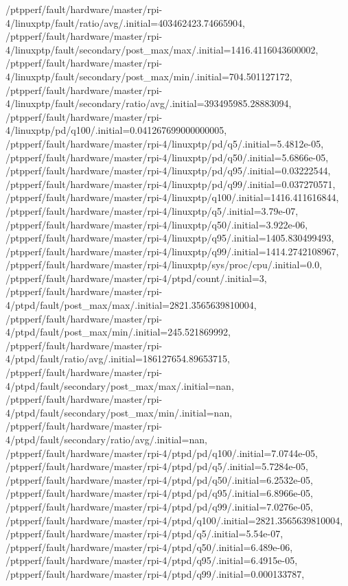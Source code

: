 {    /ptpperf/fault/hardware/master/rpi-4/linuxptp/fault/ratio/avg/.initial=403462423.74665904,
    /ptpperf/fault/hardware/master/rpi-4/linuxptp/fault/secondary/post_max/max/.initial=1416.4116043600002,
    /ptpperf/fault/hardware/master/rpi-4/linuxptp/fault/secondary/post_max/min/.initial=704.501127172,
    /ptpperf/fault/hardware/master/rpi-4/linuxptp/fault/secondary/ratio/avg/.initial=393495985.28883094,
    /ptpperf/fault/hardware/master/rpi-4/linuxptp/pd/q100/.initial=0.041267699000000005,
    /ptpperf/fault/hardware/master/rpi-4/linuxptp/pd/q5/.initial=5.4812e-05,
    /ptpperf/fault/hardware/master/rpi-4/linuxptp/pd/q50/.initial=5.6866e-05,
    /ptpperf/fault/hardware/master/rpi-4/linuxptp/pd/q95/.initial=0.03222544,
    /ptpperf/fault/hardware/master/rpi-4/linuxptp/pd/q99/.initial=0.037270571,
    /ptpperf/fault/hardware/master/rpi-4/linuxptp/q100/.initial=1416.411616844,
    /ptpperf/fault/hardware/master/rpi-4/linuxptp/q5/.initial=3.79e-07,
    /ptpperf/fault/hardware/master/rpi-4/linuxptp/q50/.initial=3.922e-06,
    /ptpperf/fault/hardware/master/rpi-4/linuxptp/q95/.initial=1405.830499493,
    /ptpperf/fault/hardware/master/rpi-4/linuxptp/q99/.initial=1414.2742108967,
    /ptpperf/fault/hardware/master/rpi-4/linuxptp/sys/proc/cpu/.initial=0.0,
    /ptpperf/fault/hardware/master/rpi-4/ptpd/count/.initial=3,
    /ptpperf/fault/hardware/master/rpi-4/ptpd/fault/post_max/max/.initial=2821.3565639810004,
    /ptpperf/fault/hardware/master/rpi-4/ptpd/fault/post_max/min/.initial=245.521869992,
    /ptpperf/fault/hardware/master/rpi-4/ptpd/fault/ratio/avg/.initial=186127654.89653715,
    /ptpperf/fault/hardware/master/rpi-4/ptpd/fault/secondary/post_max/max/.initial=nan,
    /ptpperf/fault/hardware/master/rpi-4/ptpd/fault/secondary/post_max/min/.initial=nan,
    /ptpperf/fault/hardware/master/rpi-4/ptpd/fault/secondary/ratio/avg/.initial=nan,
    /ptpperf/fault/hardware/master/rpi-4/ptpd/pd/q100/.initial=7.0744e-05,
    /ptpperf/fault/hardware/master/rpi-4/ptpd/pd/q5/.initial=5.7284e-05,
    /ptpperf/fault/hardware/master/rpi-4/ptpd/pd/q50/.initial=6.2532e-05,
    /ptpperf/fault/hardware/master/rpi-4/ptpd/pd/q95/.initial=6.8966e-05,
    /ptpperf/fault/hardware/master/rpi-4/ptpd/pd/q99/.initial=7.0276e-05,
    /ptpperf/fault/hardware/master/rpi-4/ptpd/q100/.initial=2821.3565639810004,
    /ptpperf/fault/hardware/master/rpi-4/ptpd/q5/.initial=5.54e-07,
    /ptpperf/fault/hardware/master/rpi-4/ptpd/q50/.initial=6.489e-06,
    /ptpperf/fault/hardware/master/rpi-4/ptpd/q95/.initial=6.4915e-05,
    /ptpperf/fault/hardware/master/rpi-4/ptpd/q99/.initial=0.000133787,
}
